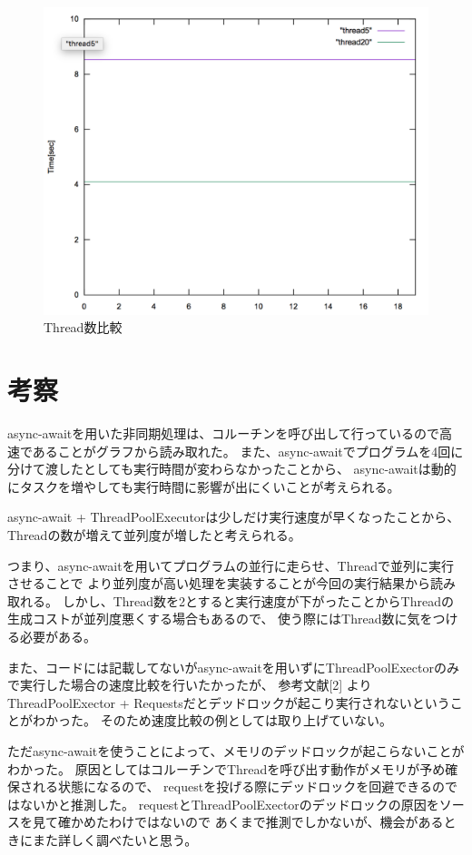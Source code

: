 \documentclass[14pt, oneside]{article}     	%
\begin{document}
\begin{figure}[H]
  \centering
  \includegraphics[width=13cm]{time3.png}
  \caption{Thread数比較}
  \label{result3}
\end{figure}


\section{考察}
async-awaitを用いた非同期処理は、コルーチンを呼び出して行っているので高速であることがグラフから読み取れた。
また、async-awaitでプログラムを4回に分けて渡したとしても実行時間が変わらなかったことから、
async-awaitは動的にタスクを増やしても実行時間に影響が出にくいことが考えられる。

async-await + ThreadPoolExecutorは少しだけ実行速度が早くなったことから、
Threadの数が増えて並列度が増したと考えられる。

つまり、async-awaitを用いてプログラムの並行に走らせ、Threadで並列に実行させることで
より並列度が高い処理を実装することが今回の実行結果から読み取れる。
しかし、Thread数を2とすると実行速度が下がったことからThreadの生成コストが並列度悪くする場合もあるので、
使う際にはThread数に気をつける必要がある。

また、コードには記載してないがasync-awaitを用いずにThreadPoolExectorのみで実行した場合の速度比較を行いたかったが、
参考文献[2] よりThreadPoolExector + Requestsだとデッドロックが起こり実行されないということがわかった。
そのため速度比較の例としては取り上げていない。

ただasync-awaitを使うことによって、メモリのデッドロックが起こらないことがわかった。
原因としてはコルーチンでThreadを呼び出す動作がメモリが予め確保される状態になるので、
requestを投げる際にデッドロックを回避できるのではないかと推測した。
requestとThreadPoolExectorのデッドロックの原因をソースを見て確かめたわけではないので
あくまで推測でしかないが、機会があるときにまた詳しく調べたいと思う。
\end{document}
